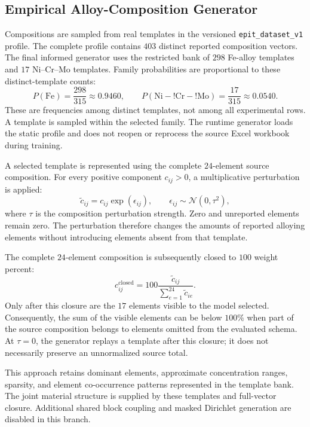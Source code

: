 \documentclass{article}
\begin{document}
\subsection{Empirical Alloy-Composition Generator}
\label{sec:composition-generator}

Compositions are sampled from real templates in the versioned
\texttt{epit\_dataset\_v1} profile. The complete profile contains \(403\)
distinct reported composition vectors. The final informed generator uses the
restricted bank of \(298\) Fe-alloy templates and \(17\) Ni--Cr--Mo templates.
Family probabilities are proportional to these distinct-template counts:
\[
P(\mathrm{Fe})=\frac{298}{315}\approx0.9460,
\qquad
P(\mathrm{Ni\!-!Cr\!-!Mo})=\frac{17}{315}\approx0.0540.
\]
These are frequencies among distinct templates, not among all experimental
rows. A template is sampled within the selected family. The runtime generator
loads the static profile and does not reopen or reprocess the source Excel
workbook during training.

A selected template is represented using the complete \(24\)-element source
composition. For every positive component \(c_{ij}>0\), a multiplicative
perturbation is applied:
\begin{equation}
\widetilde c_{ij}=c_{ij}\exp(\epsilon_{ij}),
\qquad \epsilon_{ij}\sim\mathcal{N}(0,\tau^2),
\label{eq:composition-perturbation}
\end{equation}
where \(\tau\) is the composition perturbation strength. Zero and unreported
elements remain zero. The perturbation therefore changes the amounts of
reported alloying elements without introducing elements absent from that
template.

The complete \(24\)-element composition is subsequently closed to \(100\)
weight percent:
\begin{equation}
c_{ij}^{\mathrm{closed}}
=100\frac{\widetilde c_{ij}}{\sum_{e=1}^{24}\widetilde c_{ie}}.
\label{eq:composition-closure}
\end{equation}
Only after this closure are the \(17\) elements visible to the model selected.
Consequently, the sum of the visible elements can be below \(100\%\) when
part of the source composition belongs to elements omitted from the evaluated
schema. At \(\tau=0\), the generator replays a template after this closure;
it does not necessarily preserve an unnormalized source total.

This approach retains dominant elements, approximate concentration ranges,
sparsity, and element co-occurrence patterns represented in the template bank.
The joint material structure is supplied by these templates and full-vector
closure. Additional shared block coupling and masked Dirichlet generation are
disabled in this branch.
\end{document}
